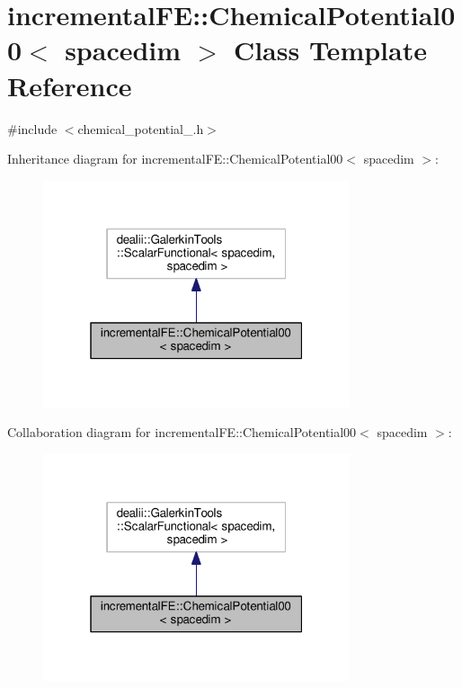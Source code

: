 \hypertarget{classincremental_f_e_1_1_chemical_potential00}{}\section{incremental\+FE\+:\+:Chemical\+Potential00$<$ spacedim $>$ Class Template Reference}
\label{classincremental_f_e_1_1_chemical_potential00}


{\ttfamily \#include $<$chemical\+\_\+potential\+\_.\+h$>$}



Inheritance diagram for incremental\+FE\+:\+:Chemical\+Potential00$<$ spacedim $>$\+:\nopagebreak
\begin{figure}[H]
\begin{center}
\leavevmode
\includegraphics[width=256pt]{classincremental_f_e_1_1_chemical_potential00__inherit__graph}
\end{center}
\end{figure}


Collaboration diagram for incremental\+FE\+:\+:Chemical\+Potential00$<$ spacedim $>$\+:\nopagebreak
\begin{figure}[H]
\begin{center}
\leavevmode
\includegraphics[width=256pt]{classincremental_f_e_1_1_chemical_potential00__coll__graph}
\end{center}
\end{figure}
